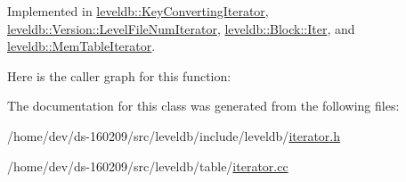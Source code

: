 Implemented in \hyperlink{classleveldb_1_1_key_converting_iterator_aa7a0281f93fbd520bf54d94bac77197a}{leveldb\+::\+Key\+Converting\+Iterator}, \hyperlink{classleveldb_1_1_version_1_1_level_file_num_iterator_ac09a8ed595aca29d90e6af91e80a4f00}{leveldb\+::\+Version\+::\+Level\+File\+Num\+Iterator}, \hyperlink{classleveldb_1_1_block_1_1_iter_afb28e69efec54ca9306fc504e139bf3f}{leveldb\+::\+Block\+::\+Iter}, and \hyperlink{classleveldb_1_1_mem_table_iterator_a5910c8d44980cdec2d8ba603aabb98b8}{leveldb\+::\+Mem\+Table\+Iterator}.



Here is the caller graph for this function\+:




The documentation for this class was generated from the following files\+:\begin{DoxyCompactItemize}
\item 
/home/dev/ds-\/160209/src/leveldb/include/leveldb/\hyperlink{iterator_8h}{iterator.\+h}\item 
/home/dev/ds-\/160209/src/leveldb/table/\hyperlink{iterator_8cc}{iterator.\+cc}\end{DoxyCompactItemize}
